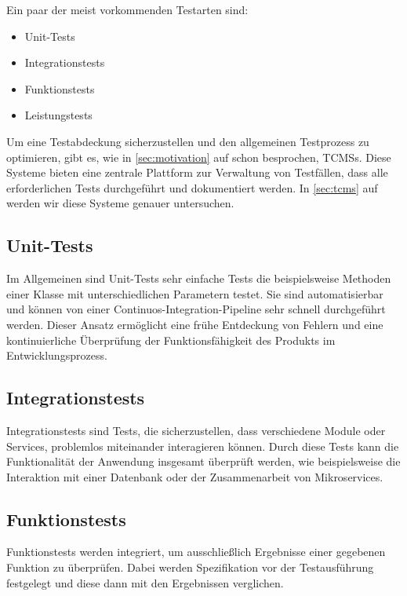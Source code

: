 \documentclass[a4paper, fontsize=11pt, parskip=half, twoside]{scrreprt}
\begin{document}
	Ein paar der meist vorkommenden Testarten sind:
	
	\begin{itemize}
		\item Unit-Tests
		\item Integrationstests
		\item Funktionstests
		\item Leistungstests
	\end{itemize}

	Um eine Testabdeckung sicherzustellen und den allgemeinen Testprozess zu optimieren, gibt es, wie in \autoref{sec:motivation} auf  schon besprochen, \aclp{TCMS}. 
	Diese Systeme bieten eine zentrale Plattform zur Verwaltung von Testfällen, dass alle erforderlichen Tests durchgeführt und dokumentiert werden. 
	In \autoref{sec:tcms} auf  werden wir diese Systeme genauer untersuchen.
	
	\textcite{ammann_introduction_2016}
	
	\subsection{Unit-Tests}
	Im Allgemeinen sind Unit-Tests sehr einfache Tests die beispielsweise Methoden einer Klasse mit unterschiedlichen Parametern testet. 
	Sie sind automatisierbar und können von einer Continuos-Integration-Pipeline sehr schnell durchgeführt werden. 
	Dieser Ansatz ermöglicht eine frühe Entdeckung von Fehlern und eine kontinuierliche Überprüfung der Funktionsfähigkeit des Produkts im Entwicklungsprozess.
	
	\subsection{Integrationstests}
	Integrationstests sind Tests, die sicherzustellen, dass verschiedene Module oder Services, problemlos miteinander interagieren können. 
	Durch diese Tests kann die Funktionalität der Anwendung insgesamt überprüft werden, wie beispielsweise die Interaktion mit einer Datenbank oder der Zusammenarbeit von Mikroservices.
	
	\subsection{Funktionstests}
	Funktionstests werden integriert, um ausschließlich Ergebnisse einer gegebenen Funktion zu überprüfen. Dabei werden Spezifikation vor der Testausführung festgelegt und diese dann mit den Ergebnissen verglichen.
	
\end{document}
